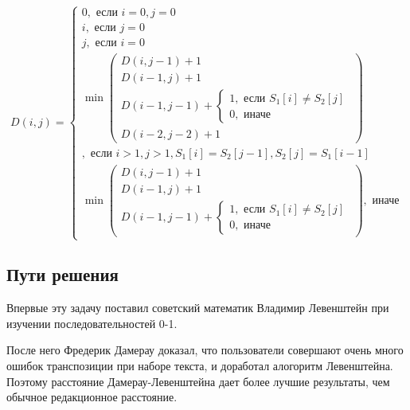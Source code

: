 \documentclass[a4paper,12pt]{article}
\begin{document}
\begin{equation}
D(i,j) =
\begin{cases}
    0, \text{ если } i = 0, j = 0 \\
    i, \text{ если } j = 0 \\
    j, \text{ если } i = 0 \\

    \min
    \left(
        \begin{matrix}
            D(i, j - 1) + 1 \\
            D(i - 1, j) + 1 \\
            D(i - 1, j - 1) +
            \begin{cases}
                1, \text{ если } S_1[i] \ne S_2[j] \\
                0, \text{ иначе}
            \end{cases} \\
            D(i - 2, j - 2) + 1
        \end{matrix}
    \right) \\
    , \text{ если } i > 1, j > 1, S_1[i] = S_2[j - 1], S_2[j] = S_1[i - 1] \\

    \min
    \left(
    \begin{matrix}
        D(i, j - 1) + 1 \\
        D(i - 1, j) + 1 \\
        D(i - 1, j - 1) +
        \begin{cases}
            1, \text{ если } S_1[i] \ne S_2[j] \\
            0, \text{ иначе}
        \end{cases}
    \end{matrix}
    \right)
    , \text{ иначе}
\end{cases}
\end{equation}

\subsection{Пути решения}

Впервые эту задачу поставил советский математик Владимир Левенштейн при
изучении последовательностей 0-1. \cite{binlev}

После него Фредерик Дамерау доказал, что пользователи совершают очень много
ошибок транспозиции при наборе текста, и доработал алогоритм Левенштейна.
Поэтому расстояние Дамерау-Левенштейна дает более лучшие результаты, чем
обычное редакционное расстояние.
\end{document}
